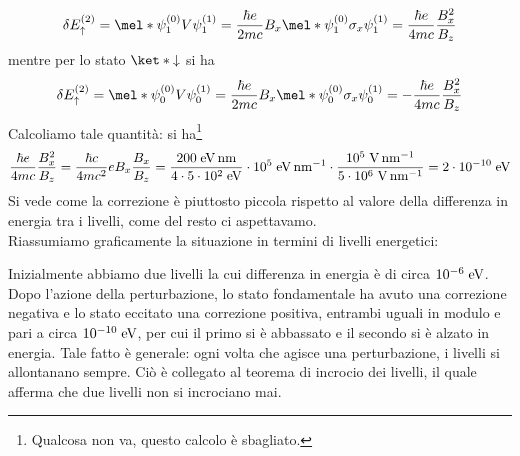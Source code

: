 \begin{soluzione}
   \begin{equation*}
      \delta E_{\uparrow}^{(2)}
      =\mel*{\psi_1^{(0)}}{V}{\psi_1^{(1)}}
      =\frac{\hbar e}{2 m c} B_x \mel*{\psi_1^{(0)}}{\sigma_x}{\psi_1^{(1)}}
      =\frac{\hbar e}{4 m c} \frac{B_x^2}{B_z}
   \end{equation*}
   mentre per lo stato $\ket*{\downarrow}$ si ha
   \begin{equation*}
      \delta E_{\uparrow}^{(2)}
      =\mel*{\psi_0^{(0)}}{V}{\psi_0^{(1)}}
      =\frac{\hbar e}{2 m c} B_x \mel*{\psi_0^{(0)}}{\sigma_x}{\psi_0^{(1)}}
      =-\frac{\hbar e}{4 m c} \frac{B_x^2}{B_z}
   \end{equation*}
   Calcoliamo tale quantità: si ha\footnote{Qualcosa non va, questo calcolo è sbagliato.}
   \begin{equation*}
      \frac{\hbar e}{4 m c} \frac{B_x^2}{B_z}
      =\frac{\hbar c}{4 m c^2} e B_x \frac{B_x}{B_z}
      =\rm \frac{200 \; eV \, nm}{4 \cdot 5 \cdot 10^2 \; eV} \cdot 10^5 \; eV \, nm^{-1} \cdot \frac{10^5 \; V \, nm^{-1}}{5 \cdot 10^6 \; V \, nm^{-1}}
      =2 \cdot 10^{-10} \; eV
   \end{equation*}
   Si vede come la correzione è piuttosto piccola rispetto al valore della differenza in energia tra i livelli, come del resto ci aspettavamo.\\
   Riassumiamo graficamente la situazione in termini di livelli energetici:
   \begin{figure}[H]
      \centering
   \end{figure}
   Inizialmente abbiamo due livelli la cui differenza in energia è di circa $10^{-6} \rm \; eV$. Dopo l'azione della perturbazione, lo stato fondamentale ha avuto una correzione negativa e lo stato eccitato una correzione positiva, entrambi uguali in modulo e pari a circa $10^{-10} \rm \; eV$, per cui il primo si è abbassato e il secondo si è alzato in energia. Tale fatto è generale: ogni volta che agisce una perturbazione, i livelli si allontanano sempre. Ciò è collegato al teorema di incrocio dei livelli, il quale afferma che due livelli non si incrociano mai.
\end{soluzione}

